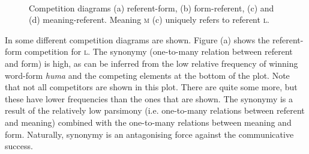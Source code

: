 \begin{figure}[t]
\centering
{}
\\
\caption{Competition diagrams (a) referent-form, (b) form-referent, (c) and (d) meaning-referent. Meaning {\scshape m} (c) uniquely refers to referent {\scshape l}.}
\label{f:st:comp}
\end{figure}

In  some different competition diagrams are shown. Figure (a) shows the referent-form competition for {\scshape l}. The synonymy (one-to-many relation between referent and form) is high, as can be inferred from the low relative frequency of winning word-form {\it huma} and the competing elements at the bottom of the plot. Note that not all competitors are shown in this plot. There are quite some more, but these have lower frequencies than the ones that are shown. The synonymy is a result of the relatively low parsimony (i.e. one-to-many relations between referent and meaning) combined with the one-to-many relations between meaning and form. Naturally, synonymy is an antagonising force against the communicative success.

